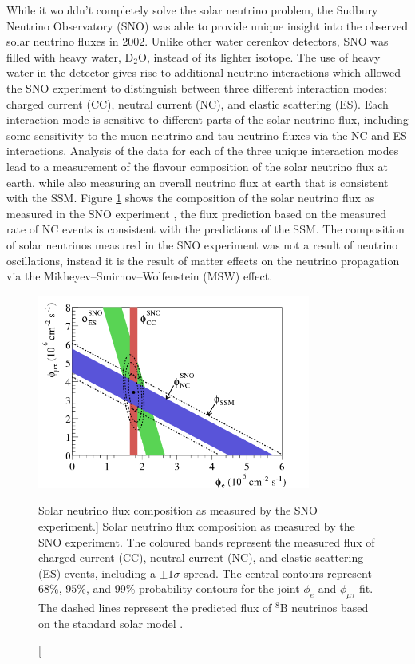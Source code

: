 While it wouldn't completely solve the solar neutrino problem, the Sudbury
Neutrino Observatory (SNO) was able to provide unique insight into the observed
solar neutrino fluxes in 2002. Unlike other water cerenkov detectors, SNO 
was filled with heavy water, \(\mbox{D}_2\mbox{O}\), instead of its lighter 
isotope. The use of heavy water in the detector gives rise to additional 
neutrino interactions which allowed the SNO experiment to distinguish between 
three different interaction modes: charged current (CC), neutral current (NC), 
and elastic scattering (ES). Each interaction mode is sensitive to different 
parts of the solar neutrino flux, including some sensitivity to the muon 
neutrino and tau neutrino fluxes via the NC and ES interactions. Analysis of the 
data for each of the three unique interaction modes lead to a measurement of 
the flavour composition of the solar neutrino flux at earth, while also 
measuring an overall neutrino flux at earth that is consistent with the SSM.
Figure \ref{fig:sno_flux} shows the composition of the solar neutrino flux as 
measured in the SNO experiment \cite{Ahmad2002}, the flux prediction based on 
the measured rate of NC events is consistent with the predictions of the 
SSM. The composition of solar neutrinos measured in the SNO experiment was not
a result of neutrino oscillations, instead it is the result of matter effects on
the neutrino propagation via the Mikheyev–Smirnov–Wolfenstein (MSW) effect.

\begin{figure}

	\centering

	\includegraphics[width=0.8\textwidth]{figures/sno_flux.png}

	\caption
	[Solar neutrino flux composition as measured by the SNO experiment.]
	{Solar neutrino flux composition as measured by the SNO experiment. The
	coloured bands represent the measured flux of charged current (CC),
	neutral current (NC), and elastic scattering (ES) events, including a \(\pm 1
	\sigma\) spread. The central contours represent 68\%, 95\%, and 99\%
	probability contours for the joint \(\phi_e\) and \(\phi_{\mu \tau}\) fit. The
	dashed lines represent the predicted flux of \(^8\mbox{B}\) neutrinos based on 
	the standard solar model \cite{Ahmad2002}. }

	\label{fig:sno_flux}

\end{figure}

